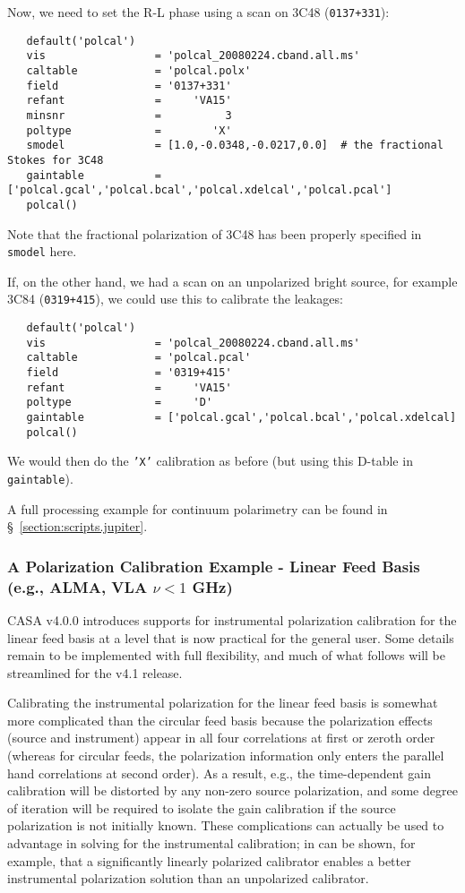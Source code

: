 Now, we need to set the R-L phase using a scan on
3C48 ({\tt 0137+331}):
\small
\begin{verbatim}
   default('polcal')
   vis                 = 'polcal_20080224.cband.all.ms'
   caltable            = 'polcal.polx'
   field               = '0137+331'
   refant              =     'VA15'        
   minsnr              =          3        
   poltype             =        'X'
   smodel              = [1.0,-0.0348,-0.0217,0.0]  # the fractional Stokes for 3C48
   gaintable           = ['polcal.gcal','polcal.bcal','polcal.xdelcal','polcal.pcal']
   polcal()
\end{verbatim}
\normalsize

Note that the fractional polarization of 3C48 has been properly specified 
in {\tt smodel} here.


If, on the other hand, we had a scan on an unpolarized bright source,
for example 3C84 ({\tt 0319+415}), we could use this to calibrate the
leakages:
\small
\begin{verbatim}
   default('polcal')
   vis                 = 'polcal_20080224.cband.all.ms'
   caltable            = 'polcal.pcal'
   field               = '0319+415'
   refant              =     'VA15'        
   poltype             =     'D'        
   gaintable           = ['polcal.gcal','polcal.bcal','polcal.xdelcal]
   polcal()
\end{verbatim}
\normalsize
We would then do the {\tt 'X'} calibration as before (but using this
D-table in {\tt gaintable}).

A full processing example for continuum polarimetry can be found
in \S~\ref{section:scripts.jupiter}.


\subsubsection{A Polarization Calibration Example - Linear Feed
  Basis (e.g., ALMA, VLA $\nu<1$ GHz)}
\label{section:cal.solve.pol.example2}

CASA v4.0.0 introduces supports for instrumental polarization 
calibration for the linear feed basis at a level that is now
practical for the general user.  Some details remain to be
implemented with full flexibility, and much of what follows
will be streamlined for the v4.1 release.

Calibrating the instrumental polarization for the linear feed basis
is somewhat more complicated than the circular feed basis because
the polarization effects (source and instrument) appear in all
four correlations at first or zeroth order (whereas for circular
feeds, the polarization information only enters the parallel
hand correlations at second order).   As a result, e.g., the 
time-dependent gain calibration will be distorted by any non-zero 
source polarization, and some degree of iteration will be required to
isolate the gain calibration if the source polarization is not
initially known.  These complications can actually be used to 
advantage in solving for the instrumental calibration; in can
be shown, for example, that a significantly linearly polarized
calibrator enables a better instrumental polarization 
solution than an unpolarized calibrator.


